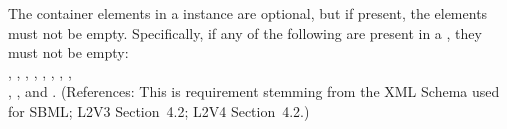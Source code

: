 The  container elements in a \Model instance are optional,
but if present, the elements must not be empty.  Specifically, if
any of the following are present in a \Model, they must not be empty:\\
,
,
,
,
, 
,
,
,\\
,
,
 and .  (References:
This is requirement stemming from the XML Schema used for SBML;
L2V3 Section~4.2; L2V4 Section~4.2.)
